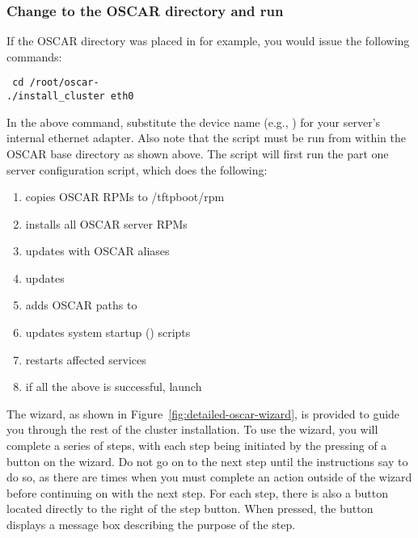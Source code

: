 \subsubsection{Change to the OSCAR directory and run }
\label{det:installcluster}

If the OSCAR directory was placed in  for example, you
would issue the following commands:

\vspace{11pt}
{\tt
  cd /root/oscar-\oscarversion \\
\indent  ./install\_cluster eth0
}
\vspace{11pt}
  
In the above command, substitute the device name (e.g., )
for your server's internal ethernet adapter. Also note that the
 script must be run from within the OSCAR base
directory as shown above. The script will first run the part one
server configuration script, which does the following:

\begin{enumerate}
\item copies OSCAR RPMs to /tftpboot/rpm
\item installs all OSCAR server RPMs
\item updates  with OSCAR aliases
\item updates  
\item adds OSCAR paths to  
\item updates system startup () scripts
\item restarts affected services
\item if all the above is successful, launch 
\end{enumerate}
  
The wizard, as shown in
Figure~\ref{fig:detailed-oscar-wizard}, is provided to guide you
through the rest of the cluster installation.  To use the wizard, you
will complete a series of steps, with each step being initiated by the
pressing of a button on the wizard. Do not go on to the next step
until the instructions say to do so, as there are times when you must
complete an action outside of the wizard before continuing on with the
next step. For each step, there is also a  button located
directly to the right of the step button. When pressed, the
 button displays a message box describing the purpose of
the step.


